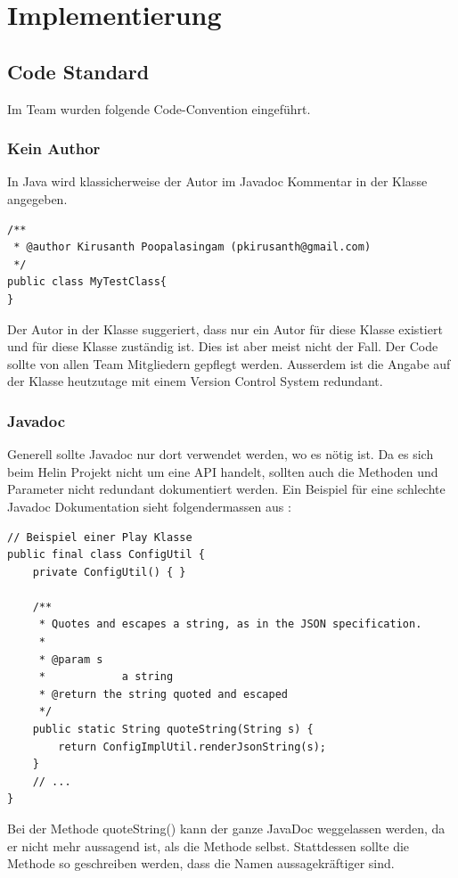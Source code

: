 \section{Implementierung}

\subsection{Code Standard}
Im Team wurden folgende Code-Convention eingeführt.

\subsubsection{Kein Author}
In Java wird klassicherweise der Autor im Javadoc Kommentar in der Klasse angegeben.

\begin{lstlisting}
/**
 * @author Kirusanth Poopalasingam (pkirusanth@gmail.com)
 */
public class MyTestClass{
}
\end{lstlisting}

Der Autor in der Klasse suggeriert, dass nur ein Autor für diese Klasse existiert und für diese Klasse zuständig ist. Dies ist aber meist nicht der Fall. 
Der Code sollte von allen Team Mitgliedern gepflegt werden. Ausserdem ist die Angabe auf der Klasse heutzutage mit einem Version Control System redundant.

\subsubsection{Javadoc}
Generell sollte Javadoc nur dort verwendet werden, wo es nötig ist. Da es sich beim Helin Projekt nicht um eine API handelt, sollten auch die Methoden und Parameter nicht redundant dokumentiert werden. Ein Beispiel für eine schlechte Javadoc Dokumentation sieht folgendermassen aus :

\begin{lstlisting}
// Beispiel einer Play Klasse
public final class ConfigUtil {
    private ConfigUtil() { }

    /**
     * Quotes and escapes a string, as in the JSON specification.
     *
     * @param s
     *            a string
     * @return the string quoted and escaped
     */
    public static String quoteString(String s) {
        return ConfigImplUtil.renderJsonString(s);
    }
    // ...
}
\end{lstlisting}

Bei der Methode quoteString() kann der ganze JavaDoc weggelassen werden, da er nicht mehr aussagend ist, als die Methode selbst.
Stattdessen sollte die Methode so geschreiben werden, dass die Namen aussagekräftiger sind.


